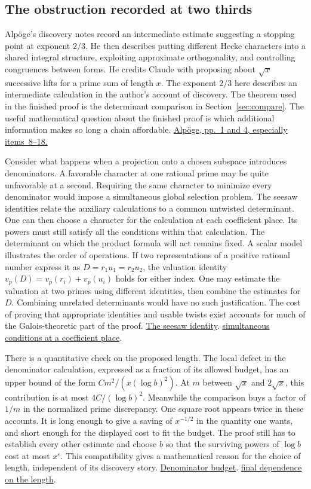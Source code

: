 \documentclass[11pt,letterpaper]{article}
\newcommand{\sref}[2]{\href{https://github.com/VladimirReshetnikov/ProveIt/blob/d8415e76ad850651f8c0083afe689dd9f4a45a10/Analysis/GeneralizedRiemannHypothesis/vendor/grh-lean/grh/src/#1.lean}{#2}}
\begin{document}
\subsection{The obstruction recorded at two thirds}

Alpöge's discovery notes record an intermediate estimate suggesting a stopping point at exponent \(2/3\). He then describes putting different Hecke characters into a shared integral structure, exploiting approximate orthogonality, and controlling congruences between forms. He credits Claude with proposing about \(\sqrt{x}\) successive lifts for a prime sum of length \(x\). The exponent \(2/3\) here describes an intermediate calculation in the author's account of discovery. The theorem used in the finished proof is the determinant comparison in Section~\ref{sec:compare}. The useful mathematical question about the finished proof is which additional information makes so long a chain affordable. \href{https://alpo.ge/remark.pdf}{Alpöge, pp.~1 and 4, especially items~8--18.}

Consider what happens when a projection onto a chosen subspace introduces denominators. A favorable character at one rational prime may be quite unfavorable at a second. Requiring the same character to minimize every denominator would impose a simultaneous global selection problem. The seesaw identities relate the auxiliary calculations to a common untwisted determinant. One can then choose a character for the calculation at each coefficient place. Its powers must still satisfy all the conditions within that calculation. The determinant on which the product formula will act remains fixed. A scalar model illustrates the order of operations. If two representations of a positive rational number express it as \(D=r_1u_1=r_2u_2\), the valuation identity \(v_p(D)=v_p(r_i)+v_p(u_i)\) holds for either index. One may estimate the valuation at two primes using different identities, then combine the estimates for \(D\). Combining unrelated determinants would have no such justification. The cost of proving that appropriate identities and usable twists exist accounts for much of the Galois-theoretic part of the proof. \sref{New/UpperBound/Seesaw/SeesawIdentity}{The seesaw identity}. \sref{New/Congruences/FitTwistsExist}{simultaneous conditions at a coefficient place}.

There is a quantitative check on the proposed length. The local defect in the denominator calculation, expressed as a fraction of its allowed budget, has an upper bound of the form \(C m^2/(x(\log b)^2)\). At \(m\) between \(\sqrt{x}\) and \(2\sqrt{x}\), this contribution is at most \(4C/(\log b)^2\). Meanwhile the comparison buys a factor of \(1/m\) in the normalized prime discrepancy. One square root appears twice in these accounts. It is long enough to give a saving of \(x^{-1/2}\) in the quantity one wants, and short enough for the displayed cost to fit the budget. The proof still has to establish every other estimate and choose \(b\) so that the surviving powers of \(\log b\) cost at most \(x^\varepsilon\). This compatibility gives a mathematical reason for the choice of length, independent of its discovery story. \sref{New/Congruences/FitTwistsExist}{Denominator budget}. \sref{New/Reduction/OneSidedBound}{final dependence on the length}.
\end{document}
